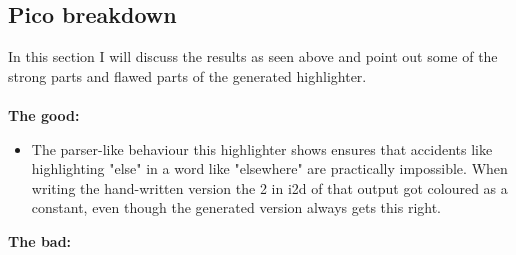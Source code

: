 \subsection{Pico breakdown}
In this section I will discuss the results as seen above and point out some of the strong parts and flawed parts of the generated highlighter.\\\\
\textbf{The good:}
\begin{itemize}
\item The parser-like behaviour this highlighter shows ensures that accidents like highlighting "else" in a word like "elsewhere" are practically impossible. When writing the hand-written version the 2 in i2d of that output got coloured as a constant, even though the generated version always gets this right.
\end{itemize}
\textbf{The bad:}
